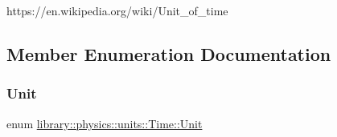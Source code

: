 https\+://en.wikipedia.\+org/wiki/\+Unit\+\_\+of\+\_\+time 

\subsection{Member Enumeration Documentation}
\mbox{\label{classlibrary_1_1physics_1_1units_1_1_time_ab876a6a05c9a2f28905f2753bfd64109}} 
\subsubsection{\texorpdfstring{Unit}{Unit}}
{\footnotesize\ttfamily enum \hyperlink{classlibrary_1_1physics_1_1units_1_1_time_ab876a6a05c9a2f28905f2753bfd64109}{library\+::physics\+::units\+::\+Time\+::\+Unit}\hspace{0.3cm}{\ttfamily [strong]}}

